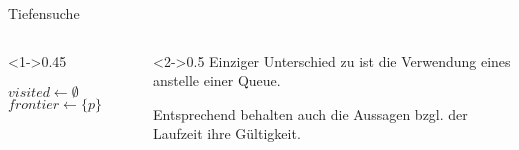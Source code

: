 \begin{frame}{Tiefensuche}
\begin{columns}[T]
\begin{column}<1->{0.45\textwidth}
\vspace*{-5pt}
\begin{algorithm}[H]
	\caption{Tiefensuche (DFS)}
	\label{trees:alg:dfs}
	\vspace*{-6pt}
	\DontPrintSemicolon
    $visited \gets \emptyset$\;
    $frontier \gets \{ p \}$\;
\end{algorithm}
\end{column}
\begin{column}<2->{0.5\textwidth}
Einziger Unterschied zu  ist die Verwendung eines  anstelle einer Queue.

\medskip

Entsprechend behalten auch die Aussagen bzgl. der Laufzeit ihre G\"ultigkeit.
\end{column}
\end{columns}
\end{frame}

